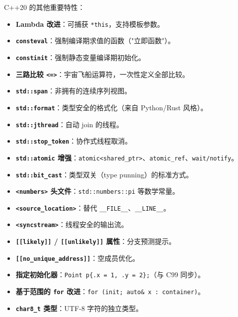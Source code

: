 \documentclass[12pt,a4paper,fontset=fandol]{ctexbook}
\newcommand{\kw}[1]{\texttt{#1}}
\begin{document}
C++20 的其他重要特性：

\begin{itemize}
  \item \textbf{Lambda 改进}：可捕获 \kw{*this}，支持模板参数。
  \item \textbf{\kw{consteval}}：强制编译期求值的函数（"立即函数"）。
  \item \textbf{\kw{constinit}}：强制静态变量编译期初始化。
  \item \textbf{三路比较 \kw{<=>}}：宇宙飞船运算符，一次性定义全部比较。
  \item \textbf{\kw{std::span}}：非拥有的连续序列视图。
  \item \textbf{\kw{std::format}}：类型安全的格式化（来自 Python/Rust 风格）。
  \item \textbf{\kw{std::jthread}}：自动 join 的线程。
  \item \textbf{\kw{std::stop\_token}}：协作式线程取消。
  \item \textbf{\kw{std::atomic} 增强}：\kw{atomic<shared\_ptr>}、\kw{atomic\_ref}、\kw{wait/notify}。
  \item \textbf{\kw{std::bit\_cast}}：类型双关（type punning）的标准方式。
  \item \textbf{\kw{<numbers>} 头文件}：\kw{std::numbers::pi} 等数学常量。
  \item \textbf{\kw{<source\_location>}}：替代 \kw{\_\_FILE\_\_}、\kw{\_\_LINE\_\_}。
  \item \textbf{\kw{<syncstream>}}：线程安全的输出流。
  \item \textbf{\kw{[[likely]]} / \kw{[[unlikely]]} 属性}：分支预测提示。
  \item \textbf{\kw{[[no\_unique\_address]]}}：空成员优化。
  \item \textbf{指定初始化器}：\kw{Point p\{.x = 1, .y = 2\};}（与 C99 同步）。
  \item \textbf{基于范围的 \kw{for} 改进}：\kw{for (init; auto\& x : container)}。
  \item \textbf{\kw{char8\_t} 类型}：UTF-8 字符的独立类型。
\end{itemize}
\end{document}
